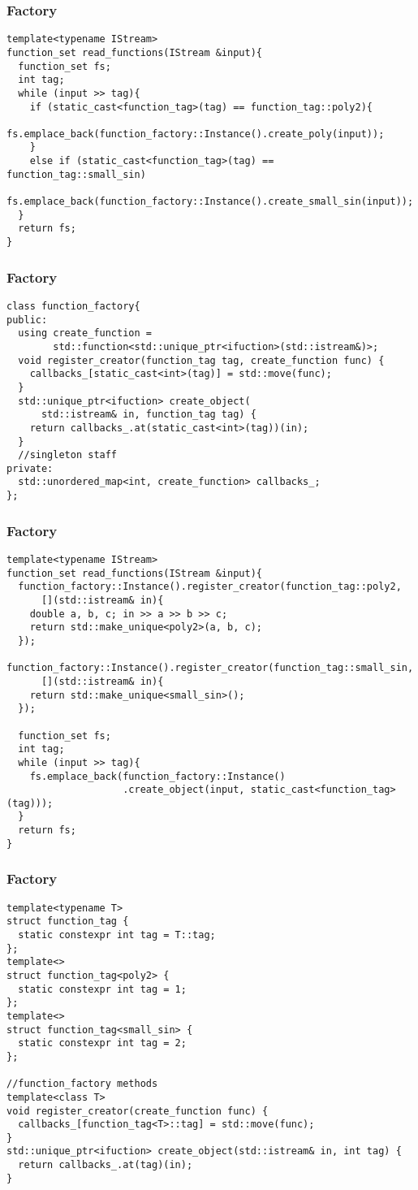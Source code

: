 \begin{frame}[fragile]
  \frametitle{Factory} 
  \begin{verbatim}
template<typename IStream>
function_set read_functions(IStream &input){
  function_set fs;
  int tag;
  while (input >> tag){
    if (static_cast<function_tag>(tag) == function_tag::poly2){
      fs.emplace_back(function_factory::Instance().create_poly(input));
    }
    else if (static_cast<function_tag>(tag) == function_tag::small_sin)
      fs.emplace_back(function_factory::Instance().create_small_sin(input));
  }
  return fs;
}
  \end{verbatim}
\end{frame}

\begin{frame}[fragile]
  \frametitle{Factory} 
  \begin{verbatim}
class function_factory{
public:
  using create_function = 
        std::function<std::unique_ptr<ifuction>(std::istream&)>;
  void register_creator(function_tag tag, create_function func) {
    callbacks_[static_cast<int>(tag)] = std::move(func);
  }
  std::unique_ptr<ifuction> create_object(
      std::istream& in, function_tag tag) {
    return callbacks_.at(static_cast<int>(tag))(in);
  }
  //singleton staff
private:
  std::unordered_map<int, create_function> callbacks_;
};
  \end{verbatim}
\end{frame}

\begin{frame}[fragile]
  \frametitle{Factory} 
  \begin{verbatim}
template<typename IStream>
function_set read_functions(IStream &input){
  function_factory::Instance().register_creator(function_tag::poly2, 
      [](std::istream& in){
    double a, b, c; in >> a >> b >> c; 
    return std::make_unique<poly2>(a, b, c);
  });
  function_factory::Instance().register_creator(function_tag::small_sin, 
      [](std::istream& in){
    return std::make_unique<small_sin>();
  });
  
  function_set fs;
  int tag;
  while (input >> tag){
    fs.emplace_back(function_factory::Instance()
                    .create_object(input, static_cast<function_tag>(tag)));
  }
  return fs;
}
  \end{verbatim}
\end{frame}

\begin{frame}[fragile]
  \frametitle{Factory} 
  \begin{verbatim}
template<typename T>
struct function_tag {
  static constexpr int tag = T::tag;
};
template<>
struct function_tag<poly2> {
  static constexpr int tag = 1;
};
template<>
struct function_tag<small_sin> {
  static constexpr int tag = 2;
};

//function_factory methods
template<class T>
void register_creator(create_function func) {
  callbacks_[function_tag<T>::tag] = std::move(func);
}
std::unique_ptr<ifuction> create_object(std::istream& in, int tag) {
  return callbacks_.at(tag)(in);
}
  \end{verbatim}
\end{frame}

